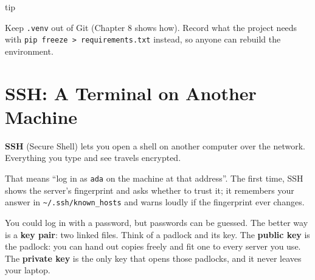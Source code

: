 \begin{callout}{tip}

Keep \texttt{.venv} out of Git (Chapter 8 shows how). Record what the project needs with \texttt{pip\ freeze\ \textgreater{}\ requirements.}\allowbreak{}\texttt{txt} instead, so anyone can rebuild the environment.

\end{callout}

\section{SSH: A Terminal on Another Machine}\label{07-installing-software-and-working-remotely:ssh-a-terminal-on-another-machine}

\textbf{SSH} (Secure Shell) lets you open a shell on another computer over the network. Everything you type and see travels encrypted.

\begin{codeblock}

\begin{Shaded}
\begin{Highlighting}[]
\end{Highlighting}
\end{Shaded}

\end{codeblock}

That means ``log in as \texttt{ada} on the machine at that address''. The first time, SSH shows the server's fingerprint and asks whether to trust it; it remembers your answer in \texttt{\textasciitilde{}/}\allowbreak{}\texttt{.ssh/}\allowbreak{}\texttt{known\_hosts} and warns loudly if the fingerprint ever changes.

You could log in with a password, but passwords can be guessed. The better way is a \textbf{key pair}: two linked files. Think of a padlock and its key. The \textbf{public key} is the padlock: you can hand out copies freely and fit one to every server you use. The \textbf{private key} is the only key that opens those padlocks, and it never leaves your laptop.

\begin{codeblock}

\begin{Shaded}
\begin{Highlighting}[]
   
\end{Highlighting}
\end{Shaded}

\end{codeblock}

